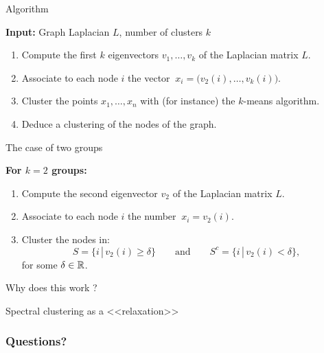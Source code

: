 \documentclass{beamer}
\begin{document}
\begin{frame}[t]{Algorithm}
	\grid

	\vspace{-0.2cm}
	\textbf{Input:} Graph Laplacian $L$, number of clusters $k$
	\begin{enumerate}
		\item Compute the first $k$ eigenvectors $v_1, \dots, v_k$ of the Laplacian matrix $L$.
			\vspace{0.1cm}
		\item Associate to each node $i$ the vector $\ x_i = \big(v_{2}(i), \dots, v_k(i) \big)$.
			\vspace{0.1cm}
		\item Cluster the points $x_1, \dots, x_n$ with (for instance) the $k$-means algorithm.
			\vspace{0.1cm}
		\item Deduce a clustering of the nodes of the graph.
	\end{enumerate}

\end{frame}

\begin{frame}[t]{The case of two groups}
	\grid

	\textbf{For $k=2$ groups:}
	\begin{enumerate}
		\item Compute the second eigenvector $v_2$ of the Laplacian matrix $L$.
			\vspace{0.1cm}
		\item Associate to each node $i$ the number $\ x_i = v_{2}(i)$.
			\vspace{0.1cm}
		\item Cluster the nodes in:
			$$
			S = \{ i \, | \, v_2(i) \geq \delta \} \qquad \text{and} \qquad
			S^c = \{ i \, | \, v_2(i) < \delta \},
			$$
			for some $\delta \in \mathbb{R}$.
	\end{enumerate}

\end{frame}

\begin{frame}[t]{Why does this work ?}
	\grid

\end{frame}
\begin{frame}[t]{Spectral clustering as a <<relaxation>>}
	\grid

\end{frame}



\appendix
\backupbegin
\begin{frame}[t]
	\frametitle{Questions?}
	\grid

	\pause
\end{frame}
\backupend
\end{document}
